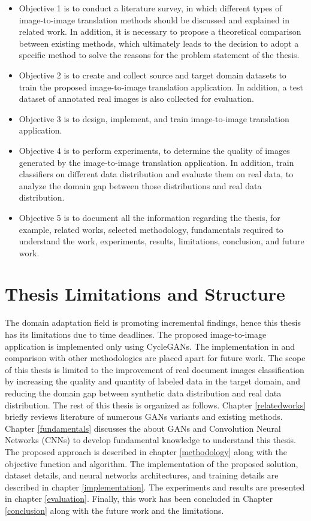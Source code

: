 \begin{itemize}[label=\EightFlowerPetalRemoved]
 \item Objective 1 is to conduct a literature survey, in which different types of image-to-image translation methods should be discussed and explained in related work. In addition, it is necessary to propose a theoretical comparison between existing methods, which ultimately leads to the decision to adopt a specific method to solve the reasons for the problem statement of the thesis.
\item Objective 2 is to create and collect source and target domain datasets to train the proposed image-to-image translation application. In addition, a test dataset of annotated real images is also collected for evaluation.
\item Objective 3 is to design, implement, and train image-to-image translation application.
\item Objective 4 is to perform experiments, to determine the quality of images generated by the image-to-image translation application. In addition, train classifiers on different data distribution and evaluate them on real data, to analyze the domain gap between those distributions and real data distribution.
\item Objective 5 is to document all the information regarding the thesis, for example, related works, selected methodology, fundamentals required to understand the work, experiments, results, limitations, conclusion, and future work.
\end{itemize}


\section{Thesis Limitations and Structure}\label{thesisstructurelimitations}
The domain adaptation field is promoting incremental findings, hence this thesis has its limitations due to time deadlines. The proposed image-to-image application is implemented only using \acp{CycleGAN}. The implementation in and comparison with other methodologies are placed apart for future work. The scope of this thesis is limited to the improvement of real document images classification by increasing the quality and quantity of labeled data in the target domain, and reducing the domain gap between synthetic data distribution and real data distribution. The rest of this thesis is organized as follows. Chapter \ref{relatedworks} briefly reviews literature of numerous \acp{GAN} variants and existing methods. Chapter \ref{fundamentals} discusses the about \acp{GAN} and Convolution Neural Networks (CNNs) to develop fundamental knowledge to understand this thesis. The proposed approach is described in chapter \ref{methodology} along with the objective function and algorithm. The implementation of the proposed solution, dataset details, and neural networks architectures, and training details are described in chapter \ref{implementation}. The experiments and results are presented in chapter \ref{evaluation}. Finally, this work has been concluded in Chapter \ref{conclusion} along with the future work and the limitations.


